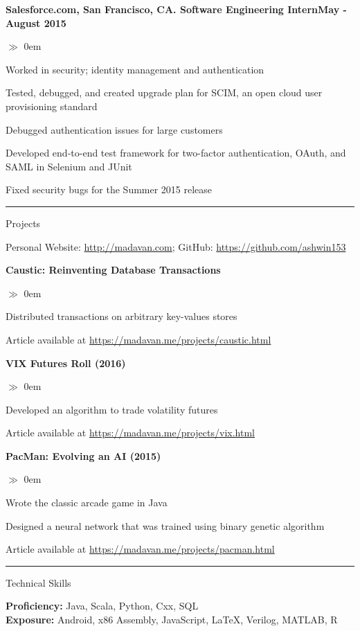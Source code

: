 \documentclass{article}
\begin{document}
\noindent\textbf{Salesforce.com, San Francisco, CA. Software Engineering
Intern\hfill{May - August 2015}}
\begin{list}{$\gg$}{}  
  \itemsep0em
  \item Worked in security; identity management and authentication
  \item Tested, debugged, and created upgrade plan for SCIM, an open cloud user provisioning standard
  \item Debugged authentication issues for large customers
  \item Developed end-to-end test framework for two-factor authentication,
  OAuth, and SAML in Selenium and JUnit
  \item Fixed security bugs for the Summer 2015 release
\end{list}

\hrule\medskip

\centerline{\large \sc Projects}\smallskip 
\centerline{Personal Website: \url{http://madavan.com}; GitHub:
\url{https://github.com/ashwin153}}\medskip

\noindent\textbf{Caustic: Reinventing Database Transactions}
\begin{list}{$\gg$}{}
  \itemsep0em
  \item Distributed transactions on arbitrary key-values stores
  \item Article available at \url{https://madavan.me/projects/caustic.html}
\end{list}

\noindent\textbf{VIX Futures Roll (2016)}
\begin{list}{$\gg$}{}
  \itemsep0em
  \item Developed an algorithm to trade volatility futures
  \item Article available at \url{https://madavan.me/projects/vix.html}
\end{list}

\noindent\textbf{PacMan: Evolving an AI (2015)}
\begin{list}{$\gg$}{}  
  	\itemsep0em
	\item Wrote the classic arcade game in Java
	\item Designed a neural network that was trained using binary genetic algorithm
	\item Article available at \url{https://madavan.me/projects/pacman.html}
\end{list}

\hrule\medskip

\centerline{\large \sc Technical Skills}\smallskip
\noindent\textbf{Proficiency:} Java, Scala, Python, Cxx, SQL \\
\noindent\textbf{Exposure:} Android, x86 Assembly, JavaScript, \LaTeX, Verilog, MATLAB, R \\
\end{document}
